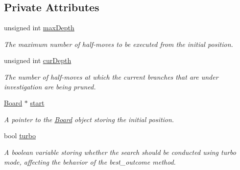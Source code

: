 \subsection*{Private Attributes}
\begin{DoxyCompactItemize}
\item 
unsigned int \hyperlink{classDFS_aacbeeaf0eebb3a37ad25b0c42bd27e64}{max\+Depth}\hypertarget{classDFS_aacbeeaf0eebb3a37ad25b0c42bd27e64}{}\label{classDFS_aacbeeaf0eebb3a37ad25b0c42bd27e64}

\begin{DoxyCompactList}\small\item\em The maximum number of half-\/moves to be executed from the initial position. \end{DoxyCompactList}\item 
unsigned int \hyperlink{classDFS_a17abe1c016f7efe83c51c4ee9ba541f3}{cur\+Depth}\hypertarget{classDFS_a17abe1c016f7efe83c51c4ee9ba541f3}{}\label{classDFS_a17abe1c016f7efe83c51c4ee9ba541f3}

\begin{DoxyCompactList}\small\item\em The number of half-\/moves at which the current branches that are under investigation are being pruned. \end{DoxyCompactList}\item 
\hyperlink{classBoard}{Board} $\ast$ \hyperlink{classDFS_a34ffac99b64c8f83889e66d47fa94787}{start}\hypertarget{classDFS_a34ffac99b64c8f83889e66d47fa94787}{}\label{classDFS_a34ffac99b64c8f83889e66d47fa94787}

\begin{DoxyCompactList}\small\item\em A pointer to the \hyperlink{classBoard}{Board} object storing the initial position. \end{DoxyCompactList}\item 
bool \hyperlink{classDFS_a3c4278e719f9a1d9766b4d5c60548137}{turbo}\hypertarget{classDFS_a3c4278e719f9a1d9766b4d5c60548137}{}\label{classDFS_a3c4278e719f9a1d9766b4d5c60548137}

\begin{DoxyCompactList}\small\item\em A boolean variable storing whether the search should be conducted using turbo mode, affecting the behavior of the best\+\_\+outcome method. \end{DoxyCompactList}\end{DoxyCompactItemize}


